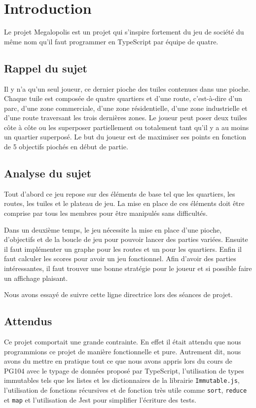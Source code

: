 \section{Introduction}
\label{sec:intro}

Le projet Megalopolis est un projet qui s'inspire fortement du jeu de société du même nom qu'il faut programmer en TypeScript par équipe de quatre.

\subsection{Rappel du sujet}
Il y n'a qu'un seul joueur, ce dernier pioche des tuiles contenues dans une pioche. Chaque tuile est composée de quatre quartiers et d'une route, c'est-à-dire d'un parc, d'une zone commerciale, d'une zone résidentielle, d'une zone industrielle et d'une route traversant les trois dernières zones. Le joueur peut poser deux tuiles côte à côte ou les superposer partiellement ou totalement tant qu'il y a au moins un quartier superposé. Le but du joueur est de maximiser ses points en fonction de 5 objectifs piochés en début de partie.

\subsection{Analyse du sujet}
Tout d'abord ce jeu repose sur des éléments de base tel que les quartiers, les routes, les tuiles et le plateau de jeu. La mise en place de ces éléments doit être comprise par tous les membres pour être manipulés sans difficultés. 

Dans un deuxième temps, le jeu nécessite la mise en place d'une pioche, d'objectifs et de la boucle de jeu pour pouvoir lancer des parties variées. Ensuite il faut implémenter un graphe pour les routes et un pour les quartiers. Enfin il faut calculer les scores pour avoir un jeu fonctionnel. Afin d'avoir des parties intéressantes, il faut trouver une bonne stratégie pour le joueur et si possible faire un affichage plaisant.

Nous avons essayé de suivre cette ligne directrice lors des séances de projet.

\subsection{Attendus}
Ce projet comportait une grande contrainte. En effet il était attendu que nous programmions ce projet de manière fonctionnelle et pure. Autrement dit, nous avons du mettre en pratique tout ce que nous avons appris lors du cours de PG104 avec le typage de données proposé par TypeScript, l'utilisation de types immutables tels que les listes et les dictionnaires de la librairie \texttt{Immutable.js}, l'utilisation de fonctions récursives et de fonction très utile comme \texttt{sort}, \texttt{reduce} et \texttt{map} et l'utilisation de Jest pour simplifier l'écriture des tests.
